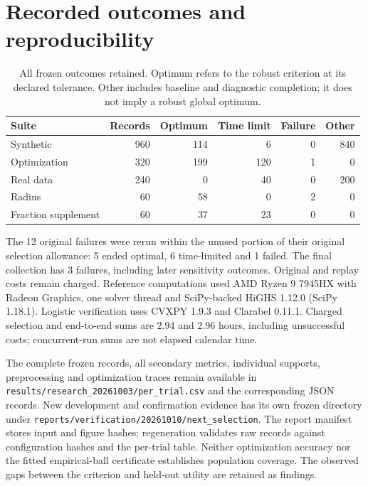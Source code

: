 \documentclass[11pt,a4paper]{article}
\begin{document}
\FloatBarrier
\section{Recorded outcomes and reproducibility}\label{sec:records}
\begin{table}[tbp]\centering\small\setlength{\tabcolsep}{3.5pt}
\caption{All frozen outcomes retained. Optimum refers to the robust criterion at its declared tolerance. Other includes baseline and diagnostic completion; it does not imply a robust global optimum.}\label{tab:outcomes}
\begin{tabularx}{\linewidth}{@{}Yrrrrr@{}}
\toprule Suite & Records & Optimum & Time limit & Failure & Other \\
\midrule
Synthetic & 960 & 114 & 6 & 0 & 840 \\
Optimization & 320 & 199 & 120 & 1 & 0 \\
Real data & 240 & 0 & 40 & 0 & 200 \\
Radius & 60 & 58 & 0 & 2 & 0 \\
Fraction supplement & 60 & 37 & 23 & 0 & 0 \\
\bottomrule\end{tabularx}\end{table}
The 12 original failures were rerun within the unused portion of their original selection allowance: 5 ended optimal, 6 time-limited and 1 failed. The final collection has 3 failures, including later sensitivity outcomes. Original and replay costs remain charged.
Reference computations used AMD Ryzen 9 7945HX with Radeon Graphics, one solver thread and SciPy-backed HiGHS 1.12.0 (SciPy 1.18.1). Logistic verification uses CVXPY 1.9.3 and Clarabel 0.11.1. Charged selection and end-to-end sums are 2.94 and 2.96 hours, including unsuccessful costs; concurrent-run sums are not elapsed calendar time.


The complete frozen records, all secondary metrics, individual supports,
preprocessing and optimization traces remain available in
\texttt{results/research\_20261003/per\_trial.csv} and the corresponding JSON records.
New development and confirmation evidence has its own frozen directory under
\texttt{reports/verification/20261010/next\_selection}. The report manifest stores
input and figure hashes; regeneration validates raw records against configuration
hashes and the per-trial table. Neither optimization accuracy nor the fitted
empirical-ball certificate establishes population coverage. The observed gaps
between the criterion and held-out utility are retained as findings.
\end{document}

